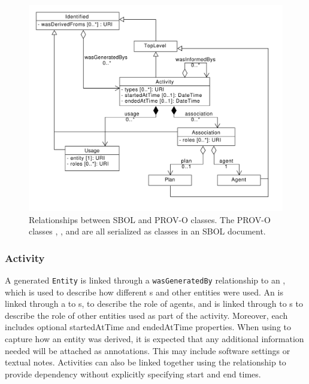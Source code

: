 \begin{figure}[ht]
\begin{center}
\includegraphics[scale=0.6]{uml/provenance}
\caption[]{Relationships between SBOL and PROV-O classes. The PROV-O classes , , and  are all serialized as  classes in an SBOL document.
\label{uml:provenance}}
\end{center}
\end{figure}

\subsubsection{Activity}
\label{sec:Activity}

A generated \texttt{Entity} is linked through a \texttt{wasGeneratedBy} relationship to an , which is used to describe how different s and other entities were used. An  is linked through a  to s, to describe the role of agents, and is linked through  to s to describe the role of other entities used as part of the activity. Moreover, each  includes optional startedAtTime and endedAtTime properties. When using  to capture how an entity was derived, it is expected that any additional information needed will be attached as annotations. This may include software settings or textual notes. Activities can also be linked together using the  relationship to provide dependency without explicitly specifying start and end times.

